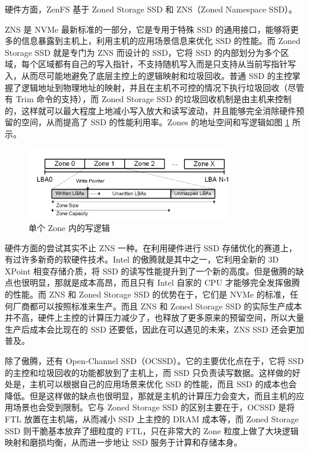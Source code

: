 硬件方面，ZenFS 基于 Zoned Storage SSD 和 ZNS（Zoned Namespace SSD）。

ZNS 是 NVMe 最新标准的一部分，它是专用于特殊 SSD 的通用接口，能够将更多的信息暴露到主机上，利用主机的应用场景信息来优化 SSD 的性能。而 Zoned Storage SSD 就是专门为 ZNS 而设计的 SSD，它将 SSD 的内部划分为多个区域，每个区域都有自己的写入指针，不支持随机写入而是只支持从当前写指针写入，从而尽可能地避免了底层主控上的逻辑映射和垃圾回收。普通 SSD 的主控掌握了逻辑地址到物理地址的映射，并且在主机不可控的情况下执行垃圾回收（尽管有 Trim 命令的支持\cite{liang_itrim_2021}），而 Zoned Storage SSD 的垃圾回收机制是由主机来控制的，这样就可以最大程度上地减小写入放大和读写波动，并且能够完全消除硬件预留的空间，从而提高了 SSD 的性能利用率。Zones 的地址空间和写逻辑如图 \ref{zns} 所示。

\begin{figure}[htbp]
    \centering
    \includegraphics[width=0.8\textwidth]{fig/zns}
    \caption{单个 Zone 内的写逻辑}
    \label{zns}
\end{figure}

硬件方面的尝试其实不止 ZNS 一种。在利用硬件进行 SSD 存储优化的赛道上，有过许多新奇的软硬件技术。Intel 的傲腾就是其中之一，它利用全新的 3D XPoint 相变存储介质，将 SSD 的读写性能提升到了一个新的高度。但是傲腾的缺点也很明显，那就是成本高昂，而且只有 Intel 自家的 CPU 才能够完全发挥傲腾的性能。而 ZNS 和 Zoned Storage SSD 的优势在于，它们是 NVMe 的标准，任何厂商都可以按照标准来生产。而且 ZNS 和 Zoned Storage SSD 的实际生产成本并不高，硬件上主控的计算压力减少了，也释放了更多原来的预留空间，所以大量生产后成本会比现在的 SSD 还要低，因此在可以遇见的未来，ZNS SSD 还会更加普及。

除了傲腾，还有 Open-Channel SSD（OCSSD）\cite{lu_mitigating_2019}。它的主要优化点在于，它将 SSD 的主控和垃圾回收的功能都放到了主机上，而 SSD 只负责读写数据。这样做的好处是，主机可以根据自己的应用场景来优化 SSD 的性能，而且 SSD 的成本也会降低。但是这样做的缺点也很明显，那就是主机的计算压力会变大，而且主机的应用场景也会受到限制。它与 Zoned Storage SSD 的区别主要在于，OCSSD 是将 FTL 放置在主机端，从而减小 SSD 上主控的 DRAM 成本等，而 Zoned Storage SSD 则干脆基本放弃了细粒度的 FTL，只在非常大的 Zone 粒度上做了大块逻辑映射和磨损均衡，从而进一步地让 SSD 服务于计算和存储本身。

